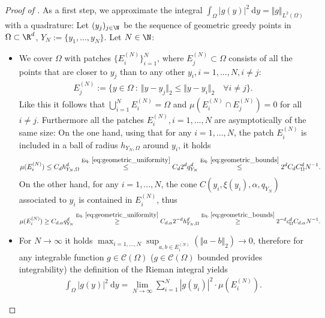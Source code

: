 \documentclass[a4paper, 10pt]{article}
\begin{document}
\begin{proof}[Proof of ]
%
As a first step, we approximate the integral $\int_\Omega |g(y)|^2 ~ \mathrm{d}y = \Vert g \Vert_{L^2(\Omega)}$ with a quadrature:
Let $(y_j)_{j \in \N}$ be the sequence of geometric greedy points in $\Omega \subset \R^d$, $Y_N := \{y_1, ..., y_N\}$. 
Let $N \in \N$:
\begin{itemize}
\item We cover $\Omega$ with patches $\{ E_i^{(N)} \}_{i=1}^N$, 
where $E_j^{(N)} \subset \Omega$ consists of all the points that are closer to $y_j$ than to any other $y_i, i=1, ..., N, i \neq j$:
\begin{align*}
E_j^{(N)} := \{y \in \Omega ~:~ \Vert y - y_j \Vert_2 \leq \Vert y - y_i \Vert_2 \quad \forall i \neq j \}.
\end{align*}
Like this it follows that $\bigcup_{i=1}^N E_i^{(N)} = \Omega$ and $\mu(E_i^{(N)} \cap E_j^{(N)}) = 0$ for all $i \neq j$.
Furthermore all the patches $E_i^{(N)}, i=1, ..., N$ are asymptotically of the same size:
On the one hand, using that for any $i=1, ..., N$, 
the patch $E_i^{(N)}$ is included in a ball of radius $h_{Y_N, \Omega}$ around $y_i$, it holds
\begin{align}
\label{eq:patch_size_upper_bound}
\mu(E_i^{(N)}) \leq C_d h_{Y_N, \Omega}^d \stackrel{\text{Eq.\ } \eqref{eq:geometric_uniformity}}{\leq} C_d 2^d q_{Y_N}^d \stackrel{\text{Eq.\ } \eqref{eq:geometric_bounds}}{\leq} 2^d C_d C_\Omega^d N^{-1}.
\end{align}
On the other hand, for any $i=1, ..., N$, 
the cone $C(y_i, \xi(y_i), \alpha, q_{Y_N})$ associated to $y_i$ is contained in $E_i^{(N)}$, thus
\begin{align}
\label{eq:patch_size_lower_bound}
\mu(E_i^{(N)}) \geq C_{d, \alpha} q_{Y_N}^d \stackrel{\text{Eq.\ } \eqref{eq:geometric_uniformity}}{\geq} 
C_{d, \alpha} 2^{-d} h_{Y_N, \Omega}^d 
\stackrel{\text{Eq.\ } \eqref{eq:geometric_bounds}}{\geq}  2^{-d} c_\Omega^{d} C_{d, \alpha} N^{-1}.
\end{align}
%
%
\item For $N \rightarrow \infty$ it holds $\max_{i=1, ..., N} \sup_{a, b \in \overline{E_i^{(N)}}}( \Vert a - b \Vert_2) \rightarrow 0$, 
therefore for any integrable function $g \in \mathcal{C}(\Omega)$ ($g \in \mathcal{C}(\Omega)$ bounded provides integrability) the definition of the Rieman integral yields
\begin{align*}
\int_{\Omega} |g(y)|^2 ~ \mathrm{d}y = \lim_{N \rightarrow \infty} \sum_{i=1}^N |g(y_i)|^2 \cdot \mu(E_i^{(N)}).

\end{align*}
\end{itemize}
\end{proof}
\end{document}

